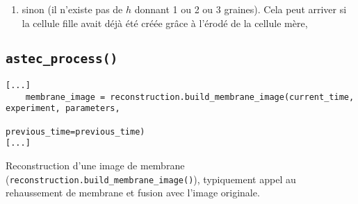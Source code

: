 \documentclass{article}
\def \mycolor {red}
\begin{document}
\begin{enumerate}
\item sinon  (il n'existe pas de $h$ donnant 1 ou 2 ou 3 graines). Cela peut arriver si la cellule fille avait d\'ej\`a \'et\'e cr\'e\'ee gr\^ace \`a l'\'erod\'e de la cellule m\`ere,

\end{enumerate}


\color{black}


\subsection{\texttt{astec\_process()}}
\color{black}
\begin{verbatim}
[...]
    membrane_image = reconstruction.build_membrane_image(current_time, experiment, parameters,
                                                         previous_time=previous_time)
[...]
\end{verbatim}
\color{\mycolor}
Reconstruction d'une image de membrane 
(\verb|reconstruction.build_membrane_image()|), typiquement appel au rehaussement de membrane et fusion avec l'image originale.
\end{document}
